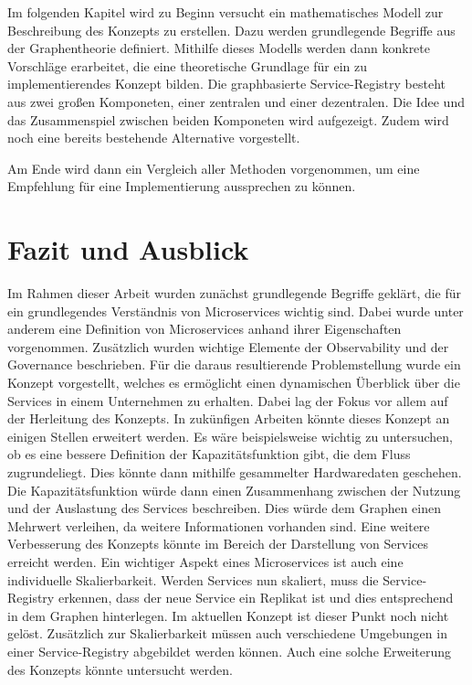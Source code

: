 \documentclass[
	12pt,
	BCOR=5mm,
	DIV=12,
	headinclude=on,
	footinclude=off,
	parskip=half,
	bibliography=totoc,
	listof=entryprefix,
	toc=listof,
	numbers=noenddot,
	plainfootsepline
]{scrreprt}
\begin{document}
Im folgenden Kapitel wird zu Beginn versucht ein mathematisches Modell zur Beschreibung des Konzepts zu erstellen. Dazu werden grundlegende Begriffe aus der Graphentheorie definiert. Mithilfe dieses Modells werden dann konkrete Vorschläge erarbeitet, die eine theoretische Grundlage für ein zu implementierendes Konzept bilden. Die graphbasierte Service-Registry besteht aus zwei großen Komponeten, einer zentralen und einer dezentralen. Die Idee und das Zusammenspiel zwischen beiden Komponeten wird aufgezeigt. Zudem wird noch eine bereits bestehende Alternative vorgestellt.

Am Ende wird dann ein Vergleich aller Methoden vorgenommen, um eine Empfehlung für eine Implementierung aussprechen zu können.





\chapter{Fazit und Ausblick}

Im Rahmen dieser Arbeit wurden zunächst grundlegende Begriffe geklärt, die für ein grundlegendes Verständnis von Microservices wichtig sind. Dabei wurde unter anderem eine Definition von Microservices anhand ihrer Eigenschaften vorgenommen. Zusätzlich wurden wichtige Elemente der Observability und der Governance beschrieben. Für die daraus resultierende Problemstellung wurde ein Konzept vorgestellt, welches es ermöglicht einen dynamischen Überblick über die Services in einem Unternehmen zu erhalten. Dabei lag der Fokus vor allem auf der Herleitung des Konzepts. In zukünfigen Arbeiten könnte dieses Konzept an einigen Stellen erweitert werden. Es wäre beispielsweise wichtig zu untersuchen, ob es eine bessere Definition der Kapazitätsfunktion gibt, die dem Fluss zugrundeliegt. Dies könnte dann mithilfe gesammelter Hardwaredaten geschehen. Die Kapazitätsfunktion würde dann einen Zusammenhang zwischen der Nutzung und der Auslastung des Services beschreiben. Dies würde dem Graphen einen Mehrwert verleihen, da weitere Informationen vorhanden sind. Eine weitere Verbesserung des Konzepts könnte im Bereich der Darstellung von Services erreicht werden. Ein wichtiger Aspekt eines Microservices ist auch eine individuelle Skalierbarkeit. Werden Services nun skaliert, muss die Service-Registry erkennen, dass der neue Service ein Replikat ist und dies entsprechend in dem Graphen hinterlegen. Im aktuellen Konzept ist dieser Punkt noch nicht gelöst. Zusätzlich zur Skalierbarkeit müssen auch verschiedene Umgebungen in einer Service-Registry abgebildet werden können. Auch eine solche Erweiterung des Konzepts könnte untersucht werden.
\end{document}
